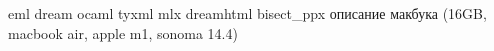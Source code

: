 \cite{OcamlBenchmark}
eml
dream
ocaml
tyxml
mlx
dreamhtml
bisect\_ppx
описание макбука (16GB, macbook air, apple m1, sonoma 14.4)
